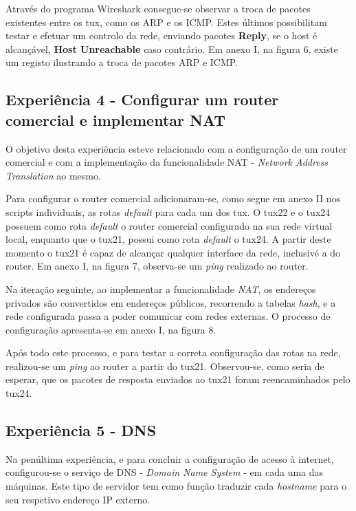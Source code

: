 \documentclass[a4paper, 11pt]{article}
\begin{document}
Através do programa Wireshark consegue-se observar a troca de pacotes existentes entre os tux, como os ARP e os ICMP. Estes últimos possibilitam testar e efetuar um controlo da rede, enviando pacotes \textbf{Reply}, se o host é alcançável, \textbf{Host Unreachable} caso contrário. Em anexo I, na figura 6, existe um registo ilustrando a troca de pacotes ARP e ICMP. 

\subsection{Experiência 4 - Configurar um router comercial e implementar NAT} 

O objetivo desta experiência esteve relacionado com a configuração de um router comercial e com a implementação da funcionalidade NAT - \textit{Network Address Translation} ao mesmo. 

Para configurar o router comercial adicionaram-se, como segue em anexo II nos scripts individuais, as rotas \textit{default} para cada um dos tux. O tux22 e o tux24 possuem como rota \textit{default} o router comercial configurado na sua rede virtual local, enquanto que o tux21, possui como rota \textit{default} o tux24. A partir deste momento o tux21 é capaz de alcançar qualquer interface da rede, inclusivé a do router. Em anexo I, na figura 7, observa-se um \textit{ping} realizado ao router.

Na iteração seguinte, ao implementar a funcionalidade \textit{NAT}, os endereços privados são convertidos em endereços públicos, recorrendo a tabelas \textit{hash}, e a rede configurada passa a poder comunicar com redes externas. O processo de configuração apresenta-se em anexo I, na figura 8.

Após todo este processo, e para testar a correta configuração das rotas na rede, realizou-se um \textit{ping} ao router a partir do tux21. Observou-se, como seria de esperar, que os pacotes de resposta enviados ao tux21 foram reencaminhados pelo tux24.

\subsection{Experiência 5 - DNS}

Na penúltima experiência, e para concluir a configuração de acesso à internet, configurou-se o serviço de DNS - \textit{Domain Name System} - em cada uma das máquinas. Este tipo de servidor tem como função traduzir cada \textit{hostname} para o seu respetivo endereço IP externo. 
\end{document}
